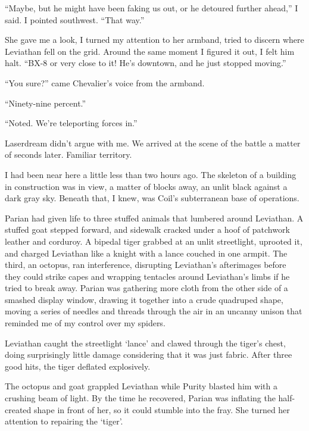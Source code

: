 ``Maybe, but he might have been faking us out, or he detoured further ahead,'' I said.  I pointed southwest.  ``That way.''



She gave me a look, I turned my attention to her armband, tried to discern where Leviathan fell on the grid.  Around the same moment I figured it out, I felt him halt.  ``BX-8 or very close to it!  He's downtown, and he just stopped moving.''



``You sure?'' came Chevalier's voice from the armband.



``Ninety-nine percent.''



``Noted.  We're teleporting forces in.''



Laserdream didn't argue with me.  We arrived at the scene of the battle a matter of seconds later.  Familiar territory.



I had been near here a little less than two hours ago.  The skeleton of a building in construction was in view, a matter of blocks away, an unlit black against a dark gray sky.  Beneath that, I knew, was Coil's subterranean base of operations.



Parian had given life to three stuffed animals that lumbered around Leviathan.  A stuffed goat stepped forward, and sidewalk cracked under a hoof of patchwork leather and corduroy.  A bipedal tiger grabbed at an unlit streetlight, uprooted it, and charged Leviathan like a knight with a lance couched in one armpit.  The third, an octopus, ran interference, disrupting Leviathan's afterimages before they could strike capes and wrapping tentacles around Leviathan's limbs if he tried to break away.  Parian was gathering more cloth from the other side of a smashed display window, drawing it together into a crude quadruped shape, moving a series of needles and threads through the air in an uncanny unison that reminded me of my control over my spiders.



Leviathan caught the streetlight `lance' and clawed through the tiger's chest, doing surprisingly little damage considering that it was just fabric.  After three good hits, the tiger deflated explosively.



The octopus and goat grappled Leviathan while Purity blasted him with a crushing beam of light.  By the time he recovered, Parian was inflating the half-created shape in front of her, so it could stumble into the fray.  She turned her attention to repairing the `tiger'.



